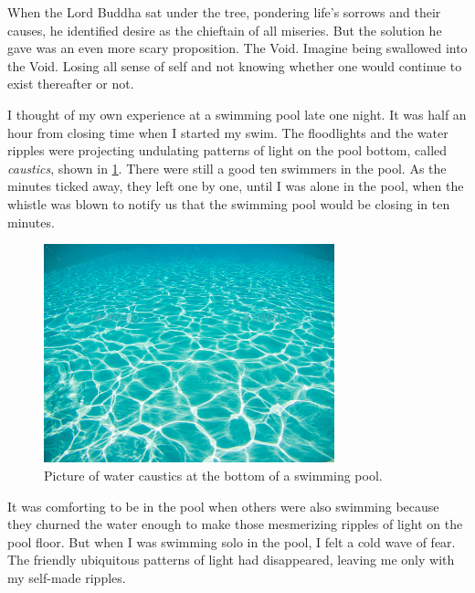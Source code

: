 \documentclass[
  a4paper,
]{article}
\begin{document}
When the Lord Buddha sat under the tree, pondering life's sorrows and
their causes, he identified desire as the chieftain of all miseries. But
the solution he gave was an even more scary proposition. The Void.
Imagine being swallowed into the Void. Losing all sense of self and not
knowing whether one would continue to exist thereafter or not.

I thought of my own experience at a swimming pool late one night. It was
half an hour from closing time when I started my swim. The floodlights
and the water ripples were projecting undulating patterns of light on
the pool bottom, called \emph{caustics}, shown in
\cref{fig:water-caustic}. There were still a good ten swimmers in the
pool. As the minutes ticked away, they left one by one, until I was
alone in the pool, when the whistle was blown to notify us that the
swimming pool would be closing in ten minutes.

\begin{figure}
\centering
\includegraphics[width=0.75\textwidth,height=\textheight]{images/water-caustic.jpg}
\caption[Picture of water caustics at the bottom of a swimming
pool.]{Picture of water caustics at the bottom of a swimming
pool.\footnotemark{}}\label{fig:water-caustic}
\end{figure}

It was comforting to be in the pool when others were also swimming
because they churned the water enough to make those mesmerizing ripples
of light on the pool floor. But when I was swimming solo in the pool, I
felt a cold wave of fear. The friendly ubiquitous patterns of light had
disappeared, leaving me only with my self-made ripples.
\end{document}

